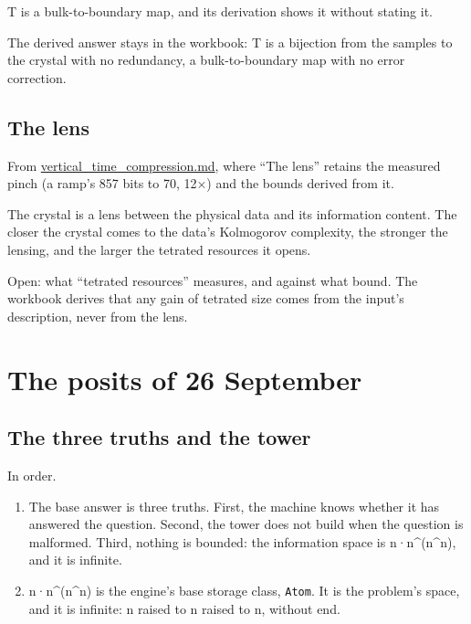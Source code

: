 T is a bulk-to-boundary map, and its derivation shows it without stating it.

The derived answer stays in the workbook: T is a bijection from the samples to the crystal with no redundancy, a bulk-to-boundary map with no error correction.

\subsection{\texorpdfstring{The lens}{The lens}}

From \hyperref[chap:vertical-time-compression]{vertical\_\allowbreak{}time\_\allowbreak{}compression.md}, where “The lens” retains the measured pinch (a ramp's 857 bits to 70, 12×) and the bounds derived from it.

The crystal is a lens between the physical data and its information content. The closer the crystal comes to the data's Kolmogorov complexity, the stronger the lensing, and the larger the tetrated resources it opens.

Open: what “tetrated resources” measures, and against what bound. The workbook derives that any gain of tetrated size comes from the input's description, never from the lens.

\section{\texorpdfstring{The posits of 26 September}{The posits of 26 September}}

\subsection{\texorpdfstring{The three truths and the tower}{The three truths and the tower}}

In order.

\begin{enumerate}
\item The base answer is three truths. First, the machine knows whether it has answered the question. Second, the tower does not build when the question is malformed. Third, nothing is bounded: the information space is n·n\textasciicircum{}(n\textasciicircum{}n), and it is infinite.
\item n·n\textasciicircum{}(n\textasciicircum{}n) is the engine's base storage class, \texttt{Atom}. It is the problem's space, and it is infinite: n raised to n raised to n, without end.
\end{enumerate}

